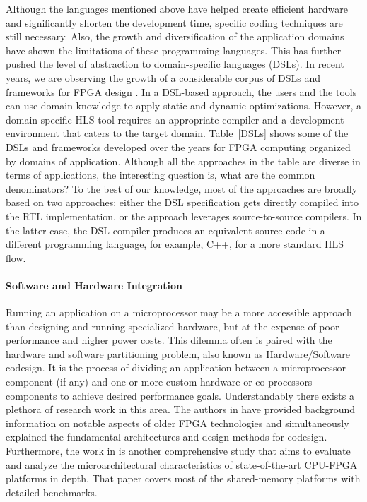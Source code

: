 Although the languages mentioned above have helped create efficient hardware and significantly shorten the development time, specific coding techniques are still necessary. Also, the growth and diversification of the application domains have shown the limitations of these programming languages. This has further pushed the level of abstraction to domain-specific languages (DSLs). In recent years, we are observing the growth of a considerable corpus of DSLs and frameworks for FPGA design \cite{7577380, transparent}. In a DSL-based approach, the users and the tools can use domain knowledge to apply static and dynamic optimizations. However, a domain-specific HLS tool requires an appropriate compiler and a development environment that caters to the target domain. Table~\ref{DSLs} shows some of the DSLs and frameworks developed over the years for FPGA computing organized by domains of application. Although all the approaches in the table are diverse in terms of applications, the interesting question is, what are the common denominators? To the best of our knowledge, most of the approaches are broadly based on two approaches: either the DSL specification gets directly compiled into the RTL implementation, or the approach leverages source-to-source compilers. In the latter case, the DSL compiler produces an equivalent source code in a different programming language, for example, C++, for a more standard HLS flow. 

\paragraph*{Software and Hardware Integration}

Running an application on a microprocessor may be a more accessible approach than designing and running specialized hardware, but at the expense of poor performance and higher power costs. This dilemma often is paired with the hardware and software partitioning problem, also known as Hardware/Software codesign. It is the process of dividing an application between a microprocessor component (if any) and one or more custom hardware or co-processors components to achieve desired performance goals. Understandably there exists a plethora of research work in this area. The authors in \cite{rfu} have provided background information on notable aspects of older FPGA technologies and simultaneously explained the fundamental architectures and design methods for codesign. Furthermore, the work in \cite{microarchitecture} is another comprehensive study that aims to evaluate and analyze the microarchitectural characteristics of state-of-the-art CPU-FPGA platforms in depth. That paper covers most of the shared-memory platforms with detailed benchmarks.

